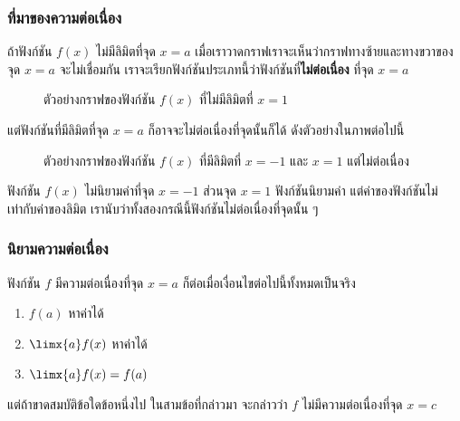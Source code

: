 \begin{frame}[t]
\frametitle{ที่มาของความต่อเนื่อง}
ถ้าฟังก์ชัน $f(x)$ ไม่มีลิมิตที่จุด $x=a$ เมื่อเราวาดกราฟเราจะเห็นว่ากราฟทางซ้ายและทางขวาของจุด $x=a$ จะไม่เชื่อมกัน เราจะเรียกฟังก์ชันประเภทนี้ว่าฟังก์ชันที่\textbf{ไม่ต่อเนื่อง} ที่จุด $x=a$
\begin{figure}[h!]
\centering
{}
\caption{ตัวอย่างกราฟของฟังก์ชัน $f(x)$ ที่ไม่มีลิมิตที่ $x=1$}
\end{figure}
\end{frame}

\begin{frame}[t]
แต่ฟังก์ชันที่มีลิมิตที่จุด $x=a$ ก็อาจจะไม่ต่อเนื่องที่จุดนั้นก็ได้ ดังตัวอย่างในภาพต่อไปนี้
\begin{figure}[h!]
\centering
{}
\caption{ตัวอย่างกราฟของฟังก์ชัน $f(x)$ ที่มีลิมิตที่ $x=-1$ และ $x=1$ แต่ไม่ต่อเนื่อง}
\end{figure}
ฟังก์ชัน $f(x)$ ไม่นิยามค่าที่จุด $x=-1$ ส่วนจุด $x=1$ ฟังก์ชันนิยามค่า แต่ค่าของฟังก์ชันไม่เท่ากับค่าของลิมิต เรานับว่าทั้งสองกรณีนี้ฟังก์ชันไม่ต่อเนื่องที่จุดนั้น ๆ
\end{frame}

\begin{frame}
\frametitle{นิยามความต่อเนื่อง}
\begin{defn}{}{}
ฟังก์ชัน $f$ มีความต่อเนื่องที่จุด $x=a$ ก็ต่อเมื่อเงื่อนไขต่อไปนี้ทั้งหมดเป็นจริง \pa
\begin{enumerate}
\item $f(a)$ หาค่าได้ \pa
\item $\limx{a} f(x)$ หาค่าได้ \pa
\item $\limx{a} f(x) = f(a)$ \pa
\end{enumerate}
แต่ถ้าขาดสมบัติข้อใดข้อหนึ่งไป ในสามข้อที่กล่าวมา จะกล่าวว่า $f$  ไม่มีความต่อเนื่องที่จุด  $x=c$ 
\end{defn}
\end{frame}


